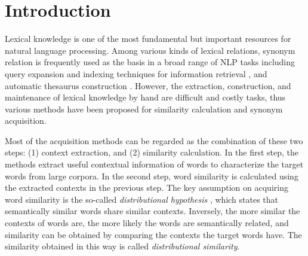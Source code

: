 \documentclass[english]{jnlp_1.4}
\begin{document}
\maketitle

\section{Introduction}


Lexical knowledge is one of the most fundamental but important
resources for natural language processing. Among various kinds of
lexical relations, synonym relation is frequently used as the basis in
a broad range of NLP tasks including query expansion and indexing
techniques for information retrieval \cite{Crouch:92,Jing:94}, and
automatic thesaurus construction
\cite{Kojima:95,Grefenstette:94}. However, the extraction,
construction, and maintenance of lexical knowledge by hand are
difficult and costly tasks, thus various methods
\cite{Hindle:90,Lin:98:automatic} have been proposed for similarity
calculation and synonym acquisition.

Most of the acquisition methods can be regarded as the combination of
these two steps: (1) context extraction, and (2) similarity
calculation. In the first step, the methods extract useful contextual
information of words to characterize the target words from large
corpora. In the second step, word similarity is calculated using the
extracted contexts in the previous step. The key assumption on
acquiring word similarity is the so-called {\it distributional
  hypothesis} \cite{Harris:85}, which states that semantically similar
words share similar contexts. Inversely, the more similar the contexts
of words are, the more likely the words are semantically related, and
similarity can be obtained by comparing the contexts the target words
have. The similarity obtained in this way is called {\em
  distributional similarity}.
\end{document}
